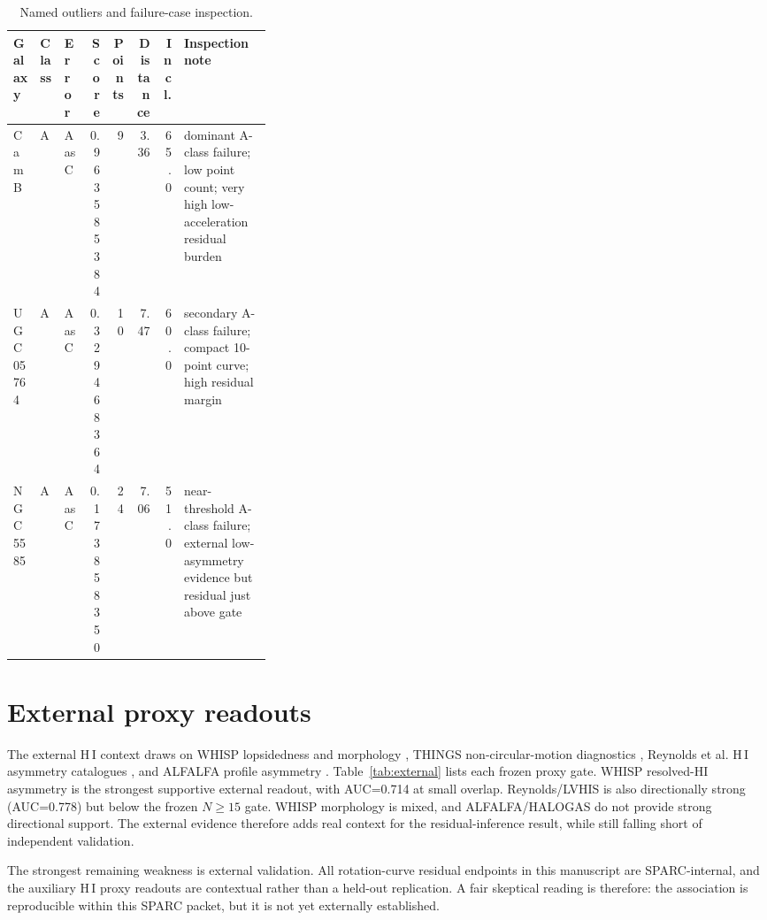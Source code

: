 \documentclass[11pt]{article}
\begin{document}
\begin{table}[H]
\centering
\caption{Named outliers and failure-case inspection.}
\scriptsize
\setlength{\tabcolsep}{3pt}
\begin{tabular}{lllrrrrp{0.34\linewidth}}
\toprule
Galaxy & Class & Error & Score & Points & Distance & Incl. & Inspection note\\
\midrule
CamB & A & A as C & 0.963585384 & 9 & 3.36 & 65.0 & dominant A-class failure; low point count; very high low-acceleration residual burden\\
UGC05764 & A & A as C & 0.329468364 & 10 & 7.47 & 60.0 & secondary A-class failure; compact 10-point curve; high residual margin\\
NGC5585 & A & A as C & 0.173858350 & 24 & 7.06 & 51.0 & near-threshold A-class failure; external low-asymmetry evidence but residual just above gate\\
\bottomrule
\end{tabular}
\end{table}

\section{External proxy readouts}

The external H\,I context draws on WHISP lopsidedness and morphology \cite{vanEymeren2011WHISP,vanEymeren2011WHISPII,Holwerda2011WHISP}, THINGS non-circular-motion diagnostics \cite{Trachternach2008THINGS}, Reynolds et al. H\,I asymmetry catalogues \cite{Reynolds2020HIAsymmetries}, and ALFALFA profile asymmetry \cite{Yu2022ALFALFA}. Table~\ref{tab:external} lists each frozen proxy gate. WHISP resolved-HI asymmetry is the strongest supportive external readout, with AUC=0.714 at small overlap. Reynolds/LVHIS is also directionally strong (AUC=0.778) but below the frozen $N\geq15$ gate. WHISP morphology is mixed, and ALFALFA/HALOGAS do not provide strong directional support. The external evidence therefore adds real context for the residual-inference result, while still falling short of independent validation.

The strongest remaining weakness is external validation. All rotation-curve residual endpoints in this manuscript are SPARC-internal, and the auxiliary H\,I proxy readouts are contextual rather than a held-out replication. A fair skeptical reading is therefore: the association is reproducible within this SPARC packet, but it is not yet externally established.
\end{document}
